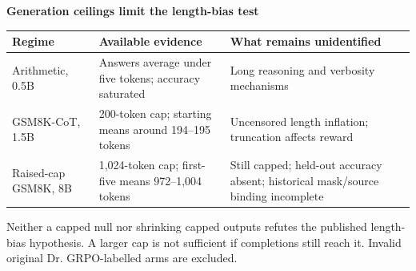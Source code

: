 \documentclass[border=8pt]{standalone}
\begin{document}
\begin{minipage}{15.2cm}\sffamily\small
{\Large\bfseries\color{ink} Generation ceilings limit the length-bias test}\par\medskip
\renewcommand{\arraystretch}{1.4}
\begin{tabular}{@{}p{3.7cm}p{5.1cm}p{5.5cm}@{}}\toprule
Regime & Available evidence & What remains unidentified\\\midrule
Arithmetic, 0.5B & Answers average under five tokens; accuracy saturated & Long reasoning and verbosity mechanisms\\
GSM8K-CoT, 1.5B & 200-token cap; starting means around 194--195 tokens & Uncensored length inflation; truncation affects reward\\
Raised-cap GSM8K, 8B & 1,024-token cap; first-five means 972--1,004 tokens & Still capped; held-out accuracy absent; historical mask/source binding incomplete\\\bottomrule
\end{tabular}\par\medskip
\colorbox{accent!10}{\parbox{14.6cm}{Neither a capped null nor shrinking capped outputs refutes the published length-bias hypothesis. A larger cap is not sufficient if completions still reach it. Invalid original Dr. GRPO-labelled arms are excluded.}}
\end{minipage}
\end{document}
